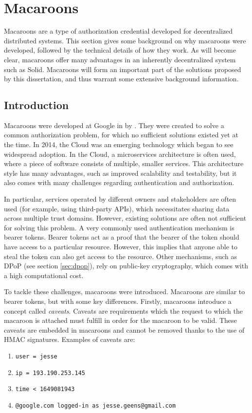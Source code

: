 \section{Macaroons}
\label{sec:macaroons}
Macaroons are a type of authorization credential developed for decentralized distributed systems. This section gives some background on why macaroons were developed, followed by the technical details of how they work. As will become clear, macaroons offer many advantages in an inherently decentralized system such as Solid. Macaroons will form an important part of the solutions proposed by this dissertation, and thus warrant some extensive background information.

\subsection{Introduction}
\label{sec:macaroons-intro}
Macaroons were developed at Google in \citeyear{macaroons} by \citeauthor{macaroons}. They were created to solve a common authorization problem, for which no sufficient solutions existed yet at the time. In 2014, the Cloud was an emerging technology which began to see widespread adoption. In the Cloud, a microservices architecture is often used, where a piece of software consists of multiple, smaller services. This architecture style has many advantages, such as improved scalability and testability, but it also comes with many challenges regarding authentication and authorization.

In particular, services operated by different owners and stakeholders are often used (for example, using third-party APIs), which necessitates sharing data across multiple trust domains. However, existing solutions are often not sufficient for solving this problem. A very commonly used authentication mechanism is bearer tokens. Bearer tokens act as a proof that the bearer of the token should have access to a particular resource. However, this implies that anyone able to steal the token can also get access to the resource. Other mechanisms, such as DPoP (see section \ref{sec:dpop}), rely on public-key cryptography, which comes with a high computational cost.

To tackle these challenges, macaroons were introduced. Macaroons are similar to bearer tokens, but with some key differences. Firstly, macaroons introduce a concept called \textit{caveats}. Caveats are requirements which the request to which the macaroon is attached must fulfill in order for the macaroon to be valid. These caveats are embedded in macaroons and cannot be removed thanks to the use of \acrshort{HMAC} signatures. Examples of caveats are:
\begin{enumerate}
    \itemsep0.1em 
    \item \texttt{user = jesse}
    \item \texttt{ip = 193.190.253.145}
    \item \texttt{time < 1649081943}
    \item \texttt{@google.com logged-in as jesse.geens@gmail.com}
\end{enumerate}

